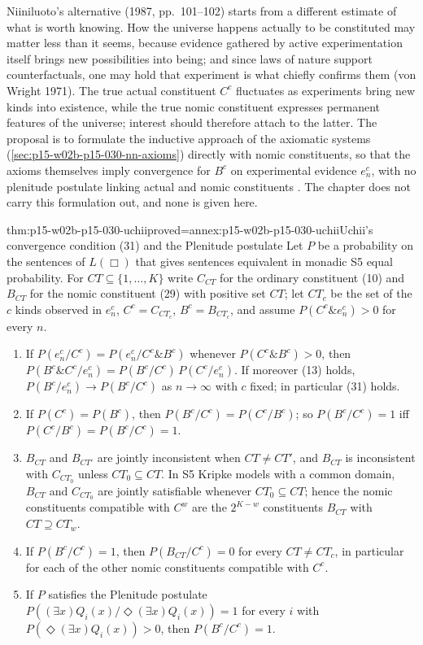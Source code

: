Niiniluoto's alternative (1987, pp.~101--102) starts from a different
estimate of what is worth knowing. How the universe happens actually to be
constituted may matter less than it seems, because evidence gathered by
active experimentation itself brings new possibilities into being; and
since laws of nature support counterfactuals, one may hold that experiment
is what chiefly confirms them (von Wright 1971). The true actual constituent \(C^c\)
fluctuates as experiments bring new kinds into existence, while the true
nomic constituent expresses permanent features of the universe; interest
should therefore attach to the latter. The proposal is to formulate the
inductive approach of the axiomatic systems
(\cref{sec:p15-w02b-p15-030-nn-axioms}) directly with nomic constituents, so
that the axioms themselves imply convergence for \(B^c\) on experimental
evidence \(e^c_n\), with no plenitude postulate linking actual and nomic
constituents \cite[p.~329]{Niiniluoto2011HintikkaProgramReading}. The chapter
does not carry this formulation out, and none is given here.

\begin{hbtheorem}{thm:p15-w02b-p15-030-uchii}{proved=annex:p15-w02b-p15-030-uchii}{Uchii's convergence condition (31) and the Plenitude postulate}
Let \(P\) be a probability on the sentences of \(L(\Box)\) that gives
sentences equivalent in monadic S5 equal probability. For \(CT\subseteq\{1,\ldots,K\}\)
write \(C_{CT}\) for the ordinary constituent (10) and \(B_{CT}\) for the
nomic constituent (29) with positive set \(CT\); let \(CT_c\) be the set of
the \(c\) kinds observed in \(e^c_n\), \(C^c=C_{CT_c}\), \(B^c=B_{CT_c}\), and
assume \(P(C^c\&e^c_n)>0\) for every \(n\).
\begin{enumerate}
\item If \(P(e^c_n/C^c)=P(e^c_n/C^c\&B^c)\) whenever \(P(C^c\&B^c)>0\), then
  \(P(B^c\&C^c/e^c_n)=P(B^c/C^c)\,P(C^c/e^c_n)\). If moreover (13) holds,
  \(P(B^c/e^c_n)\to P(B^c/C^c)\) as \(n\to\infty\) with \(c\) fixed; in
  particular (31) holds.
\item If \(P(C^c)=P(B^c)\), then \(P(B^c/C^c)=P(C^c/B^c)\); so
  \(P(B^c/C^c)=1\) iff \(P(C^c/B^c)=P(B^c/C^c)=1\).
\item \(B_{CT}\) and \(B_{CT'}\) are jointly inconsistent when \(CT\neq CT'\),
  and \(B_{CT}\) is inconsistent with \(C_{CT_0}\) unless \(CT_0\subseteq CT\).
  In S5 Kripke models with a common domain, \(B_{CT}\) and \(C_{CT_0}\) are
  jointly satisfiable whenever \(CT_0\subseteq CT\); hence the nomic
  constituents compatible with \(C^w\) are the \(2^{K-w}\) constituents
  \(B_{CT}\) with \(CT\supseteq CT_w\).
\item If \(P(B^c/C^c)=1\), then \(P(B_{CT}/C^c)=0\) for every \(CT\neq CT_c\),
  in particular for each of the other nomic constituents compatible with
  \(C^c\).
\item If \(P\) satisfies the Plenitude postulate
  \(P((\exists x)Q_i(x)/\Diamond(\exists x)Q_i(x))=1\) for every \(i\) with
  \(P(\Diamond(\exists x)Q_i(x))>0\), then \(P(B^c/C^c)=1\).
\end{enumerate}
\end{hbtheorem}

